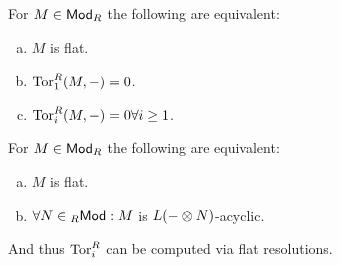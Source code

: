 \documentclass[a4paper]{report}
\begin{document}
\begin{prop}
  For $M \in \mathsf{Mod}_R$ the following are equivalent:
  \begin{enumerate}[(a)]
    \item $M$ is flat.
    \item $\operatorname{Tor}_{1}^{R}(M,-) = 0$.
    \item $\operatorname{Tor}_{i}^{R}(M,-) = 0 \forall i \ge 1$.
  \end{enumerate}

\end{prop}

\begin{thm}For $M \in \mathsf{Mod}_R$ the following are equivalent:
  \begin{enumerate}[(a)]
    \item $M$ is flat.
          \item $\forall N \in {}_R\mathsf{Mod}: M$ is $L(-\otimes N)$-acyclic.
  \end{enumerate}
   And thus $\operatorname{Tor}_{i}^{R}$ can be computed via flat resolutions.


\end{thm}
\end{document}
